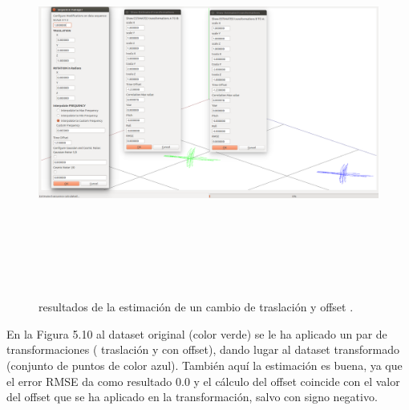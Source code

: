 \begin{figure}[h]
\begin{center}
\label{fig:opciones de View}\includegraphics[height=12.0cm,width=18.0cm]{img/cap6/Trasla_Offset_abba.png}
\hspace{0.5cm}

\end{center}

\caption{ resultados de la estimación de un cambio de traslación y offset .}
\end{figure}
En la Figura 5.10 al dataset original (color verde) se le ha aplicado un par de transformaciones ( traslación y con offset), dando lugar al dataset transformado (conjunto de puntos de color azul). También aquí la estimación es buena, ya que el error RMSE da como resultado 0.0 y el cálculo del offset  coincide con el valor del offset que se ha aplicado en la transformación, salvo con signo negativo.


